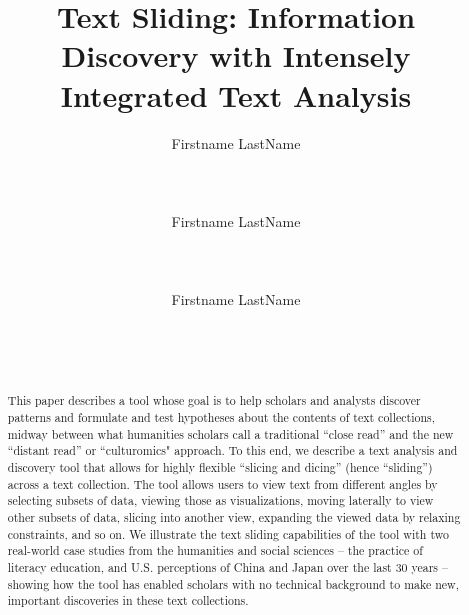 \documentclass{sig-alternate}
\begin{document}
\title{Text Sliding: Information Discovery with Intensely Integrated Text Analysis}

\author{%
\alignauthor Firstname LastName\\
       \\
       \\
       \\
\alignauthor Firstname LastName\\
       \\
       \\
       \\
\alignauthor Firstname LastName\\
       \\
       \\
       \\
}

\maketitle

\begin{abstract}

This paper describes a tool whose goal is to help scholars and analysts discover patterns and formulate and test hypotheses about the contents of  text collections, midway between what  humanities scholars call a traditional  ``close read'' and the new ``distant read'' or  ``culturomics" approach.  
To this end, we describe a text analysis and discovery tool that allows for highly flexible  ``slicing and dicing'' (hence  ``sliding'') across a text collection.  The tool allows users to view text from different angles by selecting subsets of data, viewing those as visualizations, moving laterally to view other subsets of data, slicing into another view, expanding the viewed data by relaxing constraints, and so on.  We illustrate the text sliding capabilities of the tool with two real-world case studies from the humanities and social sciences -- the practice of literacy education, and U.S. perceptions of China and Japan over the last 30 years -- showing how the tool has enabled scholars with no technical background to make new, important discoveries in these text collections.

\end{abstract}
\end{document}
